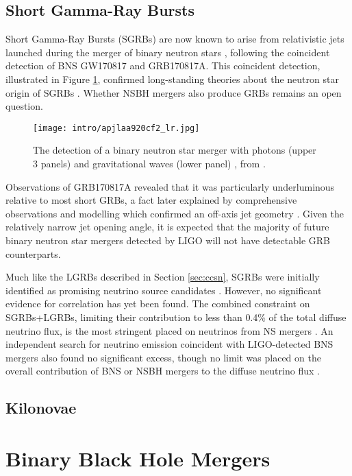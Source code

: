 \subsection{Short Gamma-Ray Bursts}

Short Gamma-Ray Bursts (SGRBs) are now known to arise from relativistic jets launched during the merger of binary neutron stars , following the coincident detection of BNS GW170817 and GRB170817A. This coincident detection, illustrated in Figure \ref{fig:gw170817}, confirmed long-standing theories about the neutron star origin of SGRBs . Whether NSBH mergers also produce GRBs remains an open question.

\begin{figure}[!ht]
	\centering \texttt{[image: intro/apjlaa920cf2\_lr.jpg]}
	\caption{The detection of a binary neutron star merger with photons (upper 3 panels) and gravitational waves (lower panel) , from \cite{grb170817}.}
	\label{fig:gw170817}
\end{figure}

Observations of GRB170817A revealed that it was particularly underluminous relative to most short GRBs, a fact later explained by comprehensive observations and modelling which confirmed an off-axis jet geometry . Given the relatively narrow jet opening angle, it is expected that the majority of future binary neutron star mergers detected by LIGO will not have detectable GRB counterparts.

Much like the LGRBs described in Section \ref{sec:ccsn}, SGRBs were initially identified as promising neutrino source candidates \cite{waxman_bahcall_97_grb}. However, no significant evidence for correlation has yet been found. The combined constraint on SGRBs+LGRBs, limiting their contribution to less than 0.4\% of the total diffuse neutrino flux, is the most stringent placed on neutrinos from NS mergers \cite{ic_grb_17}. An independent search for neutrino emission coincident with LIGO-detected BNS mergers also found no significant excess, though no limit was placed on the overall contribution of BNS or NSBH mergers to the diffuse neutrino flux .

\subsection{Kilonovae}

\section{Binary Black Hole Mergers}

